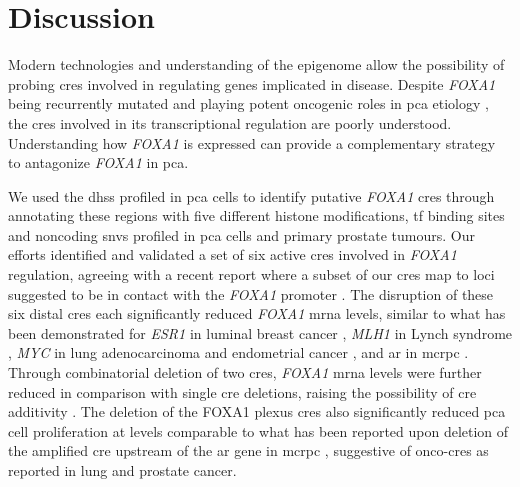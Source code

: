 \section{Discussion}

Modern technologies and understanding of the epigenome allow the possibility of probing \glspl{cre} involved in regulating genes implicated in disease.
Despite \emph{FOXA1} being recurrently mutated \cite{abeshouseMolecularTaxonomyPrimary2015,fraserGenomicHallmarksLocalized2017,barbieriExomeSequencingIdentifies2012,grassoMutationalLandscapeLethal2012,robinsonIntegrativeClinicalGenomics2015} and playing potent oncogenic roles in \gls{pca} etiology \cite{paroliaDistinctStructuralClasses2019,adamsFOXA1MutationsAlter2019,gaoForkheadDomainMutations2019}, the \glspl{cre} involved in its transcriptional regulation are poorly understood.
Understanding how \emph{FOXA1} is expressed can provide a complementary strategy to antagonize \emph{FOXA1} in \gls{pca}.

We used the \glspl{dhs} profiled in \gls{pca} cells to identify putative \emph{FOXA1} \glspl{cre} through annotating these regions with five different histone modifications, \gls{tf} binding sites and noncoding \glspl{snv} profiled in \gls{pca} cells and primary prostate tumours.
Our efforts identified and validated a set of six active \glspl{cre} involved in \emph{FOXA1} regulation, agreeing with a recent report where a subset of our \glspl{cre} map to loci suggested to be in contact with the \emph{FOXA1} promoter \cite{rhieHighresolution3DEpigenomic2019}.
The disruption of these six distal \glspl{cre} each significantly reduced \emph{FOXA1} \gls{mrna} levels, similar to what has been demonstrated for \emph{ESR1} in luminal breast cancer \cite{baileyNoncodingSomaticInherited2016}, \emph{MLH1} in Lynch syndrome \cite{liuDisruption35Kb2018}, \emph{MYC} in lung adenocarcinoma and endometrial cancer \cite{zhangIdentificationFocallyAmplified2016}, and \gls{ar} in \gls{mcrpc} \cite{takedaSomaticallyAcquiredEnhancer2018,viswanathanStructuralAlterationsDriving2018}.
Through combinatorial deletion of two \glspl{cre}, \emph{FOXA1} \gls{mrna} levels were further reduced in comparison with single \gls{cre} deletions, raising the possibility of \gls{cre} additivity \cite{osterwalderEnhancerRedundancyProvides2018}.
The deletion of the FOXA1 plexus \glspl{cre} also significantly reduced \gls{pca} cell proliferation at levels comparable to what has been reported upon deletion of the amplified \gls{cre} upstream of the \gls{ar} gene in \gls{mcrpc} \cite{takedaSomaticallyAcquiredEnhancer2018}, suggestive of onco-\glspl{cre} as reported in lung \cite{zhangIdentificationFocallyAmplified2016} and prostate \cite{takedaSomaticallyAcquiredEnhancer2018} cancer.

